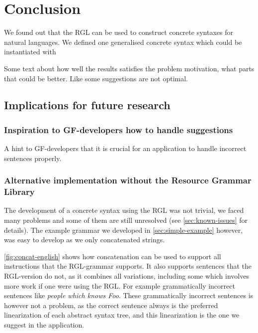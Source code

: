 \chapter{Conclusion}\label{ch:conclusion}

We found out that the RGL can be used to construct concrete syntaxes for natural languages. We defined one generalised concrete syntax which could be instantiated with 

Some text about how well the results satisfies the problem motivation, what parts that could be better. Like some suggestions are not optimal.

\section{Implications for future research}
\subsection{Inspiration to GF-developers how to handle suggestions}
A hint to GF-developers that it is crucial for an application to handle incorrect sentences properly.
\subsection{Alternative implementation without the Resource Grammar Library}
The development of a concrete syntax using the RGL was not trivial, we faced many problems and some of them are still unresolved (see \autoref{sec:known-issues} for details). The example grammar we developed in \autoref{sec:simple-example} however, was easy to develop as we only concatenated strings. 

\autoref{fig:concat-english} shows how concatenation can be used to support all instructions that the RGL-grammar supports. It also supports sentences that the RGL-version do not, as it combines all  variations, including some which involves more work if one were using the RGL. For example grammatically incorrect sentences like \emph{people which knows Foo}. These grammatically incorrect sentences is however not a problem, as the correct sentence always is the preferred linearization of each abstract syntax tree, and this linearization is the one we suggest in the application. 

